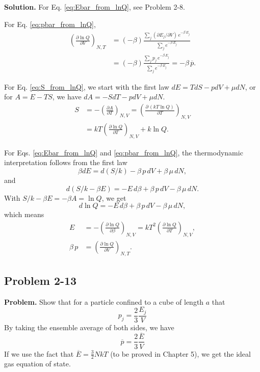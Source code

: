 \documentclass[twocolumn, 10pt]{article}
\numberwithin{equation}{section}
\newenvironment{problem}
{\par\medskip\sffamily \color{problue}
  \textbf{Problem. }\ignorespaces}
{\medskip}
\newenvironment{solution}
{\par\medskip
  \textbf{Solution. }\ignorespaces}
{\medskip}
\begin{document}
\begin{solution}
For Eq. \eqref{eq:Ebar_from_lnQ},
see Problem 2-8.

For Eq. \eqref{eq:pbar_from_lnQ},
\begin{align*}
\left(
      \frac{ \partial \ln Q }
           { \partial V }
    \right)_{N, T}
&=
  (-\beta)
  \frac{ \sum_j (\partial E_j /\partial V) \, e^{-\beta \, E_j} }
       { \sum_j e^{-\beta \, E_j} }
\\
&=
  (-\beta)
  \frac{ \sum_j p_j \, e^{-\beta \, E_j} }
       { \sum_j e^{-\beta \, E_j} }
= -\beta \, \overline p.
\end{align*}

For Eq. \eqref{eq:S_from_lnQ}, we start with the first law
$dE = T dS - p dV + \mu dN$, or for $A = E - TS$, we have
$dA = -S dT - p dV + \mu dN$.
%
\begin{align*}
  S &=
  -
  \left( \frac{ \partial A }{ \partial T } \right)_{N, V}
  =
  \left( \frac{ \partial \, ( kT \ln Q) } { \partial T } \right)_{N, V}
  \\
  &=
  kT
  \left( \frac{ \partial \ln Q } { \partial T } \right)_{N, V}
  + k \ln Q.
\end{align*}

For Eqs. \eqref{eq:Ebar_from_lnQ} and \eqref{eq:pbar_from_lnQ},
the thermodynamic interpretation follows from the first law
$$\beta dE = d(S/k) - \beta \, p \, dV + \beta \, \mu \, dN,$$
and
$$d(S/k-\beta E) = -E \, d\beta + \beta \, p \, dV - \beta \, \mu \, dN.$$
With $S/k -\beta E = -\beta A = \ln Q$, we get
$$d \ln Q = -E \, d\beta + \beta \, p \, dV - \beta \, \mu \, dN,$$
which means
\begin{align*}
  E &= -
  \left( \frac{ \partial \ln Q } { \partial \beta } \right)_{N, V}
   =
  kT^2 \left( \frac{ \partial \ln Q } { \partial T } \right)_{N, V}, \\
  \beta \, p &=
  \left( \frac{ \partial \ln Q } { \partial V } \right)_{N, T}.
\end{align*}
\end{solution}



\subsection{Problem 2-13}

\begin{problem}
  Show that for a particle confined to a cube of length $a$ that
  $$
  p_j = \frac 2 3 \frac{ E_j } { V }
  $$
  By taking the ensemble average of both sides, we have
  $$
  \overline p = \frac 2 3 \frac{ \overline E } { V }
  $$
  If we use the fact that $\overline E = \frac 3 2 N k T$
  (to be proved in Chapter 5),
  we get the ideal gas equation of state.
\end{problem}
\end{document}
